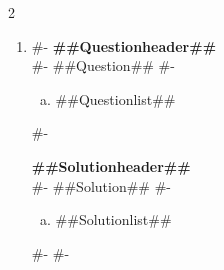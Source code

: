 \documentclass[10pt]{article}
\begin{document}
\begin{multicols}{2}


\begin{enumerate}[leftmargin=*]
#-
  \item
#-
  \textbf{##Questionheader##}\\
#-
  ##Question##
#-
  \begin{enumerate}[(a)]
    \item ##Questionlist##
  \end{enumerate}
#-

  \textbf{##Solutionheader##}\\
#-
  ##Solution##
#-
  \begin{enumerate}[(a)]
    \item ##Solutionlist##
  \end{enumerate}
#-
#-
\end{enumerate}

\end{multicols}
\end{document}
